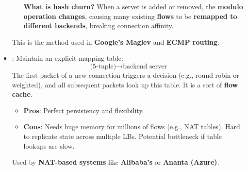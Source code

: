 \begin{itemize}
\begin{itemize}
        \textcolor{Green3}{ \textbf{What is hash churn?}} When a server is added or removed, the \textbf{modulo operation changes}, causing many existing \textbf{flows} to be \textbf{remapped to different backends}, breaking connection affinity.
    \end{itemize}
    This is the method used in \textbf{Google's Maglev} and \textbf{ECMP routing}.


    \item {}: Maintain an explicit mapping table:
    \begin{equation*}
        \text{(5-tuple)} \rightarrow \text{backend server}
    \end{equation*}
    The first packet of a new connection triggers a decision (e.g., round-robin or weighted), and all subsequent packets look up this table. It is a sort of \textbf{flow cache}.
    \begin{itemize}
        \item[\textcolor{Green3}{\faIcon{check}}] \textcolor{Green3}{\textbf{Pros}}: Perfect persistency and flexibility.
        \item[\textcolor{Red2}{\faIcon{times}}] \textcolor{Red2}{\textbf{Cons}}: Needs huge memory for millions of flows (e.g., NAT tables). Hard to replicate state across multiple LBs. Potential bottleneck if table lookups are slow.
    \end{itemize}
    Used by \textbf{NAT-based systems} like \textbf{Alibaba's} or \textbf{Ananta (Azure)}.
\end{itemize}

